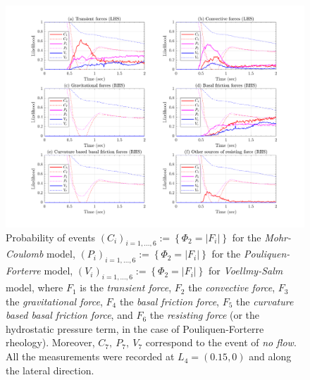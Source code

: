 \documentclass{article}
\begin{document}
\begin{figure}[H]
        \centering
        \includegraphics[width=1\textwidth]{InclinedPlane/LocalRecords/DominancePrY_L4.png}
        \caption{Probability of events $(C_i)_{i=1,...,6}:=\left\{\Phi_2=|F_i|\right\}$ for the \emph{Mohr-Coulomb} model, $(P_i)_{i=1,...,6}:=\left\{\Phi_2=|F_i|\right\}$ for the \emph{Pouliquen-Forterre} model, $(V_i)_{i=1,...,6}:=\left\{\Phi_2=|F_i|\right\}$ for \emph{Voellmy-Salm} model, where $F_1$ is the \emph{transient force}, $F_2$ the \emph{convective force}, $F_3$ the \emph{gravitational force}, $F_4$ the \emph{basal friction force}, $F_5$ the \emph{curvature based basal friction force}, and $F_6$ the \emph{resisting force} (or the hydrostatic pressure term, in the case of Pouliquen-Forterre rheology). Moreover, $C_7,\ P_7,\ V_7$ correspond to the event of \emph{no flow}. All the measurements were recorded at $L_4=(0.15,0)$ and along the lateral direction.}
        \label{fig:Ramp-FYDominance-L4}
\end{figure}
\end{document}
